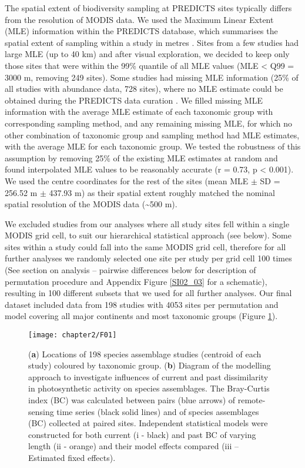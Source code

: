 The spatial extent of biodiversity sampling at PREDICTS sites typically differs from the resolution of MODIS data. We used the Maximum Linear Extent (MLE) information within the PREDICTS database, which summarises the spatial extent of sampling within a study in metres \citep{Hudson2016}. Sites from a few studies had large MLE (up to 40 km) and after visual exploration, we decided to keep only those sites that were within the 99\% quantile of all MLE values (MLE < Q99 = 3000 m, removing 249 sites). Some studies had missing MLE information (25\% of all studies with abundance data, 728 sites), where no MLE estimate could be obtained during the PREDICTS data curation \citep{Hudson2016}. We filled missing MLE information with the average MLE estimate of each taxonomic group with corresponding sampling method, and any remaining missing MLE, for which no other combination of taxonomic group and sampling method had MLE estimates, with the average MLE for each taxonomic group. We tested the robustness of this assumption by removing 25\% of the existing MLE estimates at random and found interpolated MLE values to be reasonably accurate (r = 0.73, p < 0.001). We used the centre coordinates for the rest of the sites (mean MLE $\pm$ SD = 256.52 m $\pm$ 437.93 m) as their spatial extent roughly matched the nominal spatial resolution of the MODIS data (\textasciitilde 500 m). 

We excluded studies from our analyses where all study sites fell within a single MODIS grid cell, to suit our hierarchical statistical approach (see below). Some sites within a study could fall into the same MODIS grid cell, therefore for all further analyses we randomly selected one site per study per grid cell 100 times (See section on analysis – pairwise differences below for description of permutation procedure and Appendix Figure \ref{SI02_03} for a schematic), resulting in 100 different subsets that we used for all further analyses. Our final dataset included data from 198 studies with 4053 sites per permutation and model covering all major continents and most taxonomic groups (Figure \ref{F02_01}).

\begin{figure}[ht]
\centering
\texttt{[image: chapter2/F01]}
\caption{ (\textbf{a}) Locations of 198 species assemblage studies (centroid of each study) coloured by taxonomic group. (\textbf{b}) Diagram of the modelling approach to investigate influences of current and past dissimilarity in photosynthetic activity on species assemblages. The Bray-Curtis index (BC) was calculated between pairs (blue arrows) of remote-sensing time series (black solid lines) and of species assemblages (BC) collected at paired sites. Independent statistical models were constructed for both current (i - black) and past BC of varying length (ii - orange) and their model effects compared (iii – Estimated fixed effects).}
\label{F02_01}
\end{figure}

